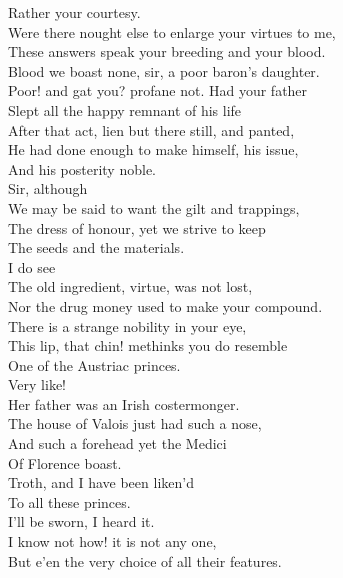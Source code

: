 \documentclass[a4paper,oneside]{memoir}
\begin{document}
\begin{drama*}
\dolspeaks {} Rather your courtesy.\\
\mammonspeaks Were there nought else to enlarge your virtues to me,\\
These answers speak your breeding and your blood.\\
\dolspeaks Blood we boast none, sir, a poor baron's daughter.\\
\mammonspeaks Poor! and gat you? profane not. Had your father\\
Slept all the happy remnant of his life\\
After that act, lien but there still, and panted,\\
He had done enough to make himself, his issue,\\
And his posterity noble.\\
\dolspeaks {} Sir, although\\
We may be said to want the gilt and trappings,\\
The dress of honour, yet we strive to keep\\
The seeds and the materials.\\
\mammonspeaks {} I do see\\
The old ingredient, virtue, was not lost,\\
Nor the drug money used to make your compound.\\
There is a strange nobility in your eye,\\
This lip, that chin! methinks you do resemble\\
One of the Austriac princes.\\
\facespeaks {} Very like!\\
Her father was an Irish costermonger.\\
\mammonspeaks The house of Valois just had such a nose,\\
And such a forehead yet the Medici\\
Of Florence boast.\\
\dolspeaks {} Troth, and I have been liken'd\\
To all these princes.\\
\facespeaks {}  I'll be sworn, I heard it.\\
\mammonspeaks I know not how! it is not any one,\\
But e'en the very choice of all their features.\\

\end{drama*}
\end{document}
